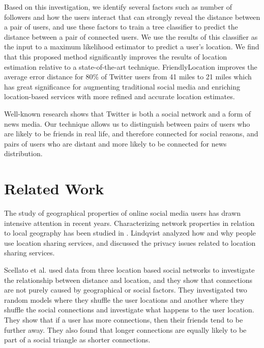 Based on this investigation, we identify several factors such as number of
followers and how the users interact that can strongly reveal the distance
between a pair of users, and use these factors to train a tree classifier to
predict the distance between a pair of connected users.
%
We use the results of this classifier as the input to a maximum likelihood
estimator to predict a user's location.
%
We find that this proposed method significantly improves the results of
location estimation relative to a state-of-the-art technique.
%
FriendlyLocation improves the average error distance for 80\% of Twitter users
from 41 miles to 21 miles which has great significance for augmenting
traditional social media and enriching location-based services with more
refined and accurate location estimates.

Well-known research \cite{kwak2010why} shows that Twitter is both a social
network and a form of news media.
%
Our technique allows us to distinguish between pairs of users who are likely
to be friends in real life, and therefore connected for social reasons, and
pairs of users who are distant and more likely to be connected for news
distribution.


\section{Related Work}

The study of geographical properties of online social media users has drawn
intensive attention in recent years.  Characterizing network properties in
relation to local geography has been studied in \cite{yardi2010tweeting}.
Lindqvist \cite{lindqvist2011m} analyzed how and why people use location
sharing services, and discussed the privacy issues related to location sharing
services.

Scellato et al. \cite{scellato2011socio} used data from three location based
social networks to investigate the relationship between distance and location,
and they show that connections are not purely caused by geographical or social
factors.  They investigated two random models where they shuffle the user
locations and another where they shuffle the social connections and investigate
what happens to the user location.  They show that if a user has more
connections, then their friends tend to be further away.  They also found that
longer connections are equally likely to be part of a social triangle as
shorter connections.

